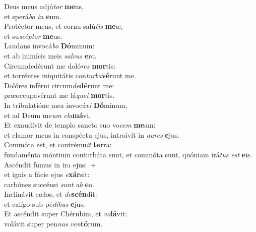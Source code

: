 \evenverse Deus meus adjú\textit{tor} \textbf{me}us,~\*\\
\evenverse et sperá\textit{bo} \textit{in} \textbf{e}um.\\
\oddverse Protéctor meus, et cornu salú\textit{tis} \textbf{me}æ,~\*\\
\oddverse et su\textit{scép}\textit{tor} \textbf{me}us.\\
\evenverse Laudans invocá\textit{bo} \textbf{Dó}minum:~\*\\
\evenverse et ab inimícis meis \textit{sal}\textit{vus} \textbf{e}ro.\\
\oddverse Circumdedérunt me doló\textit{res} \textbf{mor}tis:~\*\\
\oddverse et torréntes iniquitátis con\textit{tur}\textit{ba}\textbf{vé}runt me.\\
\evenverse Dolóres inférni circum\textit{de}\textbf{dé}runt me:~\*\\
\evenverse præoccupavérunt me lá\textit{que}\textit{i} \textbf{mor}tis.\\
\oddverse In tribulatióne mea invocá\textit{vi} \textbf{Dó}minum,~\*\\
\oddverse et ad Deum me\textit{um} \textit{cla}\textbf{má}vi.\\
\evenverse Et exaudívit de templo sancto suo vo\textit{cem} \textbf{me}am:~\*\\
\evenverse et clamor meus in conspéctu ejus, introívit in \textit{au}\textit{res} \textbf{e}jus.\\
\oddverse Commóta est, et contrému\textit{it} \textbf{ter}ra:~\*\\
\oddverse fundaménta móntium conturbáta sunt, et commóta sunt, quóniam irá\textit{tus} \textit{est} \textbf{e}is.\\
\evenverse Ascéndit fumus in ira ejus:~+\\
\evenverse  et ignis a fácie ejus \textit{e}\textbf{xár}sit:~\*\\
\evenverse carbónes succénsi \textit{sunt} \textit{ab} \textbf{e}o.\\
\oddverse Inclinávit cælos, et \textit{de}\textbf{scén}dit:~\*\\
\oddverse et calígo sub pé\textit{di}\textit{bus} \textbf{e}jus.\\
\evenverse Et ascéndit super Chérubim, et \textit{vo}\textbf{lá}vit:~\*\\
\evenverse volávit super pen\textit{nas} \textit{ven}\textbf{tó}rum.\\
